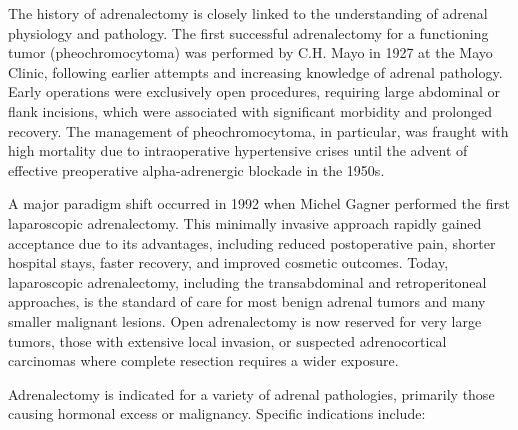 The history of adrenalectomy is closely linked to the understanding of adrenal physiology and pathology. The first successful adrenalectomy for a functioning tumor (pheochromocytoma) was performed by C.H. Mayo in 1927 at the Mayo Clinic, following earlier attempts and increasing knowledge of adrenal pathology. Early operations were exclusively open procedures, requiring large abdominal or flank incisions, which were associated with significant morbidity and prolonged recovery. The management of pheochromocytoma, in particular, was fraught with high mortality due to intraoperative hypertensive crises until the advent of effective preoperative alpha-adrenergic blockade in the 1950s.

A major paradigm shift occurred in 1992 when Michel Gagner performed the first laparoscopic adrenalectomy. This minimally invasive approach rapidly gained acceptance due to its advantages, including reduced postoperative pain, shorter hospital stays, faster recovery, and improved cosmetic outcomes. Today, laparoscopic adrenalectomy, including the transabdominal and retroperitoneal approaches, is the standard of care for most benign adrenal tumors and many smaller malignant lesions. Open adrenalectomy is now reserved for very large tumors, those with extensive local invasion, or suspected adrenocortical carcinomas where complete resection requires a wider exposure.

Adrenalectomy is indicated for a variety of adrenal pathologies, primarily those causing hormonal excess or malignancy. Specific indications include:

